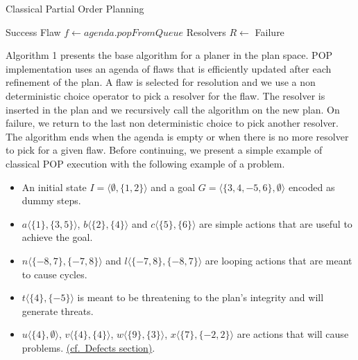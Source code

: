 \documentclass[]{article}
\providecommand{\tightlist}{%
  \setlength{\itemsep}{0pt}\setlength{\parskip}{0pt}}
\begin{document}
\begin{algorithm}\caption{Classical Partial Order Planning}\label{pop}\begin{algorithmic}[1]

\footnotesize
{}
\State {} 
 \State \Return Success
 \EndIf
    \State Flaw \(f\gets agenda.popFromQueue\)
 
\State Resolvers \(R \gets\) 
\State {} 
\State {} 
 
\State {}
\State {} \Else 
            \State {}
 \EndIf
    \EndFor
    \State \Return Failure
\State {}
\EndFunction

\end{algorithmic}\end{algorithm}

Algorithm 1 presents the base algorithm for a planer in the plan space.
POP implementation uses an agenda of flaws that is efficiently updated
after each refinement of the plan. A flaw is selected for resolution and
we use a non deterministic choice operator to pick a resolver for the
flaw. The resolver is inserted in the plan and we recursively call the
algorithm on the new plan. On failure, we return to the last non
deterministic choice to pick another resolver. The algorithm ends when
the agenda is empty or when there is no more resolver to pick for a
given flaw. Before continuing, we present a simple example of classical
POP execution with the following example of a problem.

\begin{itemize}
\tightlist
\item
  An initial state \(I = \langle \emptyset , \{ 1, 2 \} \rangle\) and a
  goal \(G = \langle \{ 3, 4, -5, 6 \}, \emptyset \rangle\) encoded as
  dummy steps.
\item
  \(a \langle \{1\}, \{3,5\} \rangle\),
  \(b \langle \{2\}, \{4\} \rangle\) and
  \(c \langle \{5\}, \{6\} \rangle\) are simple actions that are useful
  to achieve the goal.
\item
  \(n \langle \{-8, 7\}, \{-7, 8\} \rangle\) and
  \(l \langle \{-7, 8\}, \{-8, 7\} \rangle\) are looping actions that
  are meant to cause cycles.
\item
  \(t \langle \{4\}, \{-5\} \rangle\) is meant to be threatening to the
  plan's integrity and will generate threats.
\item
  \(u \langle \{4\}, \emptyset \rangle\),
  \(v \langle \{4\}, \{4\} \rangle\),
  \(w \langle \{9\}, \{3\} \rangle\),
  \(x \langle \{7\}, \{-2,2\} \rangle\) are actions that will cause
  problems. \protect\hyperlink{defects}{(cf.~Defects section)}.
\end{itemize}
\end{document}
